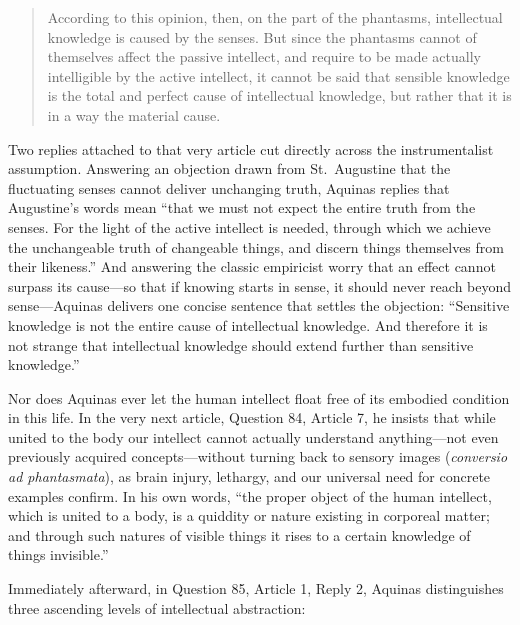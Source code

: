 \begin{quote}
According to this opinion, then, on the part of the phantasms, intellectual knowledge is caused by the senses. But since the phantasms cannot of themselves affect the passive intellect, and require to be made actually intelligible by the active intellect, it cannot be said that sensible knowledge is the total and perfect cause of intellectual knowledge, but rather that it is in a way the material cause.
\end{quote}

Two replies attached to that very article cut directly across the instrumentalist assumption. Answering an objection drawn from St.\ Augustine that the fluctuating senses cannot deliver unchanging truth, Aquinas replies that Augustine's words mean ``that we must not expect the entire truth from the senses. For the light of the active intellect is needed, through which we achieve the unchangeable truth of changeable things, and discern things themselves from their likeness.'' And answering the classic empiricist worry that an effect cannot surpass its cause---so that if knowing starts in sense, it should never reach beyond sense---Aquinas delivers one concise sentence that settles the objection: ``Sensitive knowledge is not the entire cause of intellectual knowledge. And therefore it is not strange that intellectual knowledge should extend further than sensitive knowledge.''

Nor does Aquinas ever let the human intellect float free of its embodied condition in this life. In the very next article, Question 84, Article 7, he insists that while united to the body our intellect cannot actually understand anything---not even previously acquired concepts---without turning back to sensory images (\emph{conversio ad phantasmata}), as brain injury, lethargy, and our universal need for concrete examples confirm. In his own words, ``the proper object of the human intellect, which is united to a body, is a quiddity or nature existing in corporeal matter; and through such natures of visible things it rises to a certain knowledge of things invisible.''

Immediately afterward, in Question 85, Article 1, Reply 2, Aquinas distinguishes three ascending levels of intellectual abstraction:


